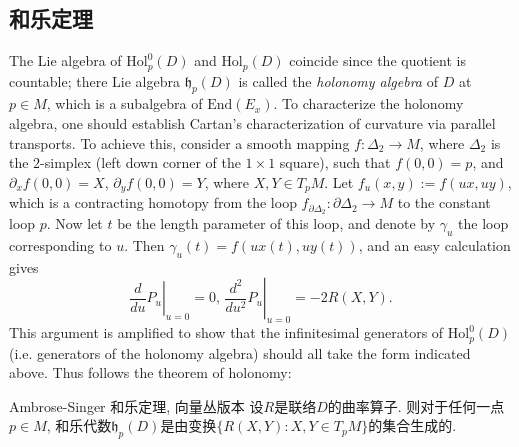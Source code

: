 \subsection{和乐定理}
The Lie algebra of $\text{Hol}_p^0(D)$ and $\text{Hol}_p(D)$ coincide since the quotient is countable; there Lie algebra $\mathfrak{h}_p(D)$ is called the \emph{holonomy algebra} of $D$ at $p\in M$, which is a subalgebra of $\text{End}(E_x)$. To characterize the holonomy algebra, one should establish Cartan's characterization of curvature via parallel transports. To achieve this, consider a smooth mapping $f:\Delta_2\to M$, where $\Delta_2$ is the $2$-simplex (left down corner of the $1\times1$ square), such that $f(0,0)=p$, and $\partial_xf(0,0)=X$, $\partial_yf(0,0)=Y$, where $X,Y\in T_pM$. Let $f_u(x,y):=f(ux,uy)$, which is a contracting homotopy from the loop $f_{\partial\Delta_2}:\partial\Delta_2\to M$ to the constant loop $p$. Now let $t$ be the length parameter of this loop, and denote by $\gamma_u$ the loop corresponding to $u$. Then $\gamma_u(t)=f(ux(t),uy(t))$, and an easy calculation gives
$$\left.\frac{d}{du}P_u\right|_{u=0}=0,\,\left.\frac{d^2}{du^2}P_u\right|_{u=0}=-2R(X,Y).$$
This argument is amplified to show that the infinitesimal generators of $\text{Hol}_p^0(D)$ (i.e. generators of the holonomy algebra) should all take the form indicated above. Thus follows the theorem of holonomy:

\begin{theorem}{Ambrose-Singer 和乐定理, 向量丛版本}
设$R$是联络$D$的曲率算子. 则对于任何一点$p\in M$, 和乐代数$\mathfrak{h}_p(D)$是由变换$\{R(X,Y):X,Y\in T_pM\}$的集合生成的.
\end{theorem}